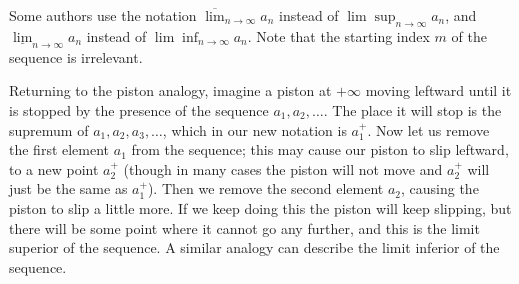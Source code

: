 \setcounter{theorem}{10}
\begin{remark}\label{6.4.11}
Some authors use the notation \(\overline{\lim}_{n \to \infty} a_n\) instead of \(\lim\sup_{n \to \infty} a_n\), and \(\underline{\lim}_{n \to \infty} a_n\) instead of \(\lim\inf_{n \to \infty} a_n\).
Note that the starting index \(m\) of the sequence is irrelevant.
\end{remark}

\begin{note}
Returning to the piston analogy, imagine a piston at \(+\infty\) moving leftward until it is stopped by the presence of the sequence \(a_1, a_2, \dots\).
The place it will stop is the supremum of \(a_1, a_2, a_3, \dots\), which in our new notation is \(a_1^+\).
Now let us remove the first element \(a_1\) from the sequence;
this may cause our piston to slip leftward, to a new point \(a_2^+\)
(though in many cases the piston will not move and \(a_2^+\) will just be the same as \(a_1^+\)).
Then we remove the second element \(a_2\), causing the piston to slip a little more.
If we keep doing this the piston will keep slipping, but there will be some point where it cannot go any further, and this is the limit superior of the sequence.
A similar analogy can describe the limit inferior of the sequence.
\end{note}

